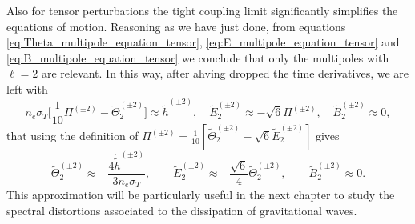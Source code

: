 Also for tensor perturbations the tight coupling limit significantly simplifies the equations of motion. Reasoning as we have just done, from equations \eqref{eq:Theta_multipole_equation_tensor}, \eqref{eq:E_multipole_equation_tensor} and \eqref{eq:B_multipole_equation_tensor} we conclude that only the multipoles with $\ell=2$ are relevant. In this way, after ahving dropped the time derivatives, we are left with 
$$n_e\sigma_T\bigg[\frac{1}{10}\Pi^{(\pm2)}-\tilde\Theta_2^{(\pm2)}\bigg]\approx\dot{\tilde h}^{(\pm2)},\quad\tilde E_2^{(\pm2)}\approx-\sqrt{6}\Pi^{(\pm2)},\quad\tilde B_{2}^{(\pm2)}\approx0,$$
that using the definition of $\Pi^{(\pm2)}=\frac{1}{10}[\tilde\Theta_{2}^{(\pm2)}-\sqrt 6 \tilde E_{2}^{(\pm2)}]$ gives
\begin{equation}
    \label{eq:TightCouplingTensor}
    \tilde\Theta_2^{(\pm2)}\approx-\frac{4\dot{\tilde h}^{(\pm2)}}{3n_e\sigma_T},\qquad\tilde E_2^{(\pm2)}\approx-\frac{\sqrt{6}}{4}\tilde\Theta_2^{(\pm2)},\qquad\tilde B_{2}^{(\pm2)}\approx0.
\end{equation}
This approximation will be particularly useful in the next chapter to study the spectral distortions associated to the dissipation of gravitational waves.
